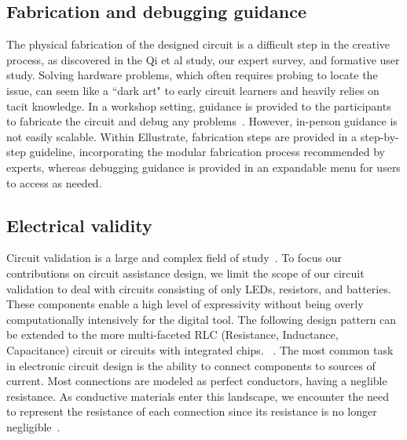 \documentclass{sigchi}
\begin{document}
\subsection{Fabrication and debugging guidance}
  The physical fabrication of the designed circuit is a difficult step in the creative process, as discovered in the Qi et al study, our expert survey, and formative user study. Solving hardware problems, which often requires probing to locate the issue, can seem like a ``dark art" to early circuit learners and heavily relies on tacit knowledge. In a workshop setting, guidance is provided to the participants to fabricate the circuit and debug any problems~\cite{qi_sketching_2014}. However, in-person guidance is not easily scalable. Within Ellustrate, fabrication steps are provided in a step-by-step guideline, incorporating the modular fabrication process recommended by experts, whereas debugging guidance is provided in an expandable menu for users to access as needed. 

\subsection{Electrical validity}
  Circuit validation is a large and complex field of study~\cite{Patra:2007vo}. To focus our contributions on circuit assistance design, we limit the scope of our circuit validation to deal with circuits consisting of only LEDs, resistors, and batteries. These components enable a high level of expressivity without being overly computationally intensively for the digital tool. The following design pattern can be extended to the more multi-faceted RLC (Resistance, Inductance, Capacitance) circuit or circuits with integrated chips. ~\cite{mellis_microcontrollers_2013}.
  The most common task in electronic circuit design is the ability to connect components to sources of current. Most connections are modeled as perfect conductors, having a neglible resistance. As conductive materials enter this landscape, we encounter the need to represent the resistance of each connection since its resistance is no longer negligible~\cite{Buechley:2012ju}. 
\end{document}
